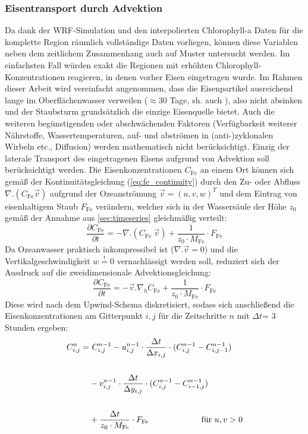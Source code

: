 \documentclass[12pt,a4paper,onecolumn,headheight=30pt]{scrartcl}
\begin{document}
\subsubsection{Eisentransport durch Advektion} \label{sec:methods_advection}
Da dank der WRF-Simulation und den interpolierten Chlorophyll-a Daten \citep{Saulquin.2019} für die komplette Region räumlich vollständige Daten vorliegen, können diese Variablen neben dem zeitlichem Zusammenhang auch auf Muster untersucht werden. Im einfachsten Fall würden exakt die Regionen mit erhöhten Chlorophyll-Konzentrationen reagieren, in denen vorher Eisen eingetragen wurde. Im Rahmen dieser Arbeit wird vereinfacht angenommen, dass die Eisenpartikel ausreichend lange im Oberflächenwasser verweilen ($\approx$30 Tage, sh. auch \citet{Cropp.2013}), also nicht absinken und der Staubsturm grundsätzlich die einzige Eisenquelle bietet. Auch die weiteren begünstigenden oder abschwächenden Faktoren (Verfügbarkeit weiterer Nährstoffe, Wassertemperaturen, auf- und abströmen in (anti-)zyklonalen Wirbeln etc., Diffusion) werden mathematisch nicht berücksichtigt. Einzig der laterale Transport des eingetragenen Eisens aufgrund von Advektion soll berücksichtigt werden. Die Eisenkonzentrationen $C_\text{Fe}$ an einem Ort können sich gemäß der Kontinuitätsgleichung (\ref{eq:fe_continuity}) durch den Zu- oder Abfluss $\nabla . (C_\text{Fe} \vec{v})$ aufgrund der Ozeanströmung $\vec{v} = (u,v,w)^T$  und dem Eintrag von eisenhaltigem Staub $F_\text{Fe}$ verändern, welcher sich in der Wassersäule der Höhe $z_0$ gemäß der Annahme aus \ref{sec:timeseries} gleichmäßig verteilt:
\begin{equation}
\frac{\partial C_\text{Fe}}{\partial t} = - \nabla . (C_\text{Fe} \ \vec{v}) + \frac{1}{z_0 \cdot M_\text{Fe}} \cdot F_\text{Fe} \label{eq:fe_continuity}
\end{equation}
Da Ozeanwasser praktisch inkompressibel ist ($\nabla . \vec{v}=0$) und die Vertikalgeschwindigkeit $w\overset{!}{=}0$ vernachlässigt werden soll, reduziert sich der Ausdruck auf die zweidimensionale Advektionsgleichung:
\begin{equation}
\frac{\partial C_\text{Fe}}{\partial t} = - \vec{v} . \nabla_h  C_\text{Fe}  + \frac{1}{z_0 \cdot M_\text{Fe}} \cdot F_\text{Fe} \label{eq:fe_advection}
\end{equation}
Diese wird nach dem Upwind-Schema diskretisiert, sodass sich anschließend die Eisenkonzentrationen am Gitterpunkt $i,j$ für die Zeitschritte $n$ mit $\Delta t$= 3 Stunden ergeben:
\begin{equation}
\begin{split}
C_{i,j}^n = &\ C_{i,j}^{n-1} - u_{i,j}^{n-1} \cdot \frac{\Delta t}{\Delta x_{i,j}} \cdot (C_{i,j}^{n-1} - C_{i,j-1}^{n-1}) \\\\
&- v_{i,j}^{n-1} \cdot \frac{\Delta t}{\Delta y_{i,j}} \cdot (C_{i,j}^{n-1} - C_{i-1,j}^{n-1})  \\\\
&+ \frac{\Delta t}{z_0 \cdot M_\text{Fe}} \cdot F_\text{Fe} \text{ \qquad  \qquad \qquad für } u,v > 0
\end{split}
\end{equation}
\end{document}
